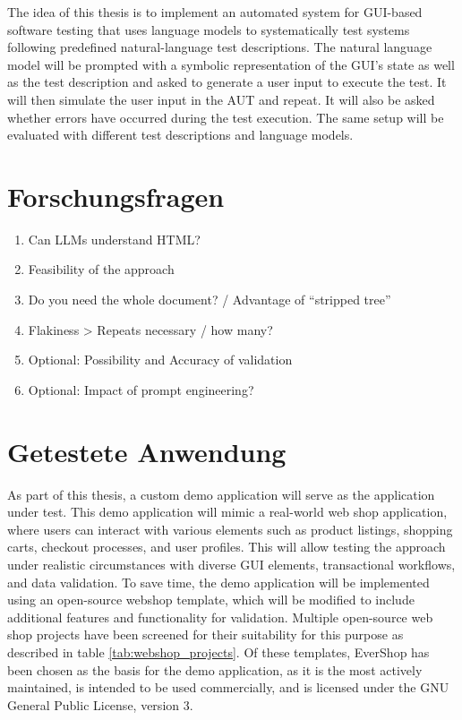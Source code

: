 The idea of this thesis is to implement an automated system for GUI-based software testing that uses language models to systematically test systems following predefined natural-language test descriptions.
The natural language model will be prompted with a symbolic representation of the GUI’s state as well as the test description and asked to generate a user input to execute the test.
It will then simulate the user input in the AUT and repeat.
It will also be asked whether errors have occurred during the test execution.
The same setup will be evaluated with different test descriptions and language models.

\section{Forschungsfragen}

\begin{enumerate}
    \item Can LLMs understand HTML?
    \item Feasibility of the approach
    \item Do you need the whole document? / Advantage of “stripped tree”
    \item Flakiness > Repeats necessary / how many?
    \item Optional: Possibility and Accuracy of validation
    \item Optional: Impact of prompt engineering?
\end{enumerate}

\section{Getestete Anwendung}

As part of this thesis, a custom demo application will serve as the application under test.
This demo application will mimic a real-world web shop application, where users can interact with various elements such as product listings, shopping carts, checkout processes, and user profiles.
This will allow testing the approach under realistic circumstances with diverse GUI elements, transactional workflows, and data validation.
To save time, the demo application will be implemented using an open-source webshop template, which will be modified to include additional features and functionality for validation.
Multiple open-source web shop projects have been screened for their suitability for this purpose as described in table \ref{tab:webshop_projects}.
Of these templates, EverShop has been chosen as the basis for the demo application, as it is the most actively maintained, is intended to be used commercially, and is licensed under the GNU General Public License, version 3.


